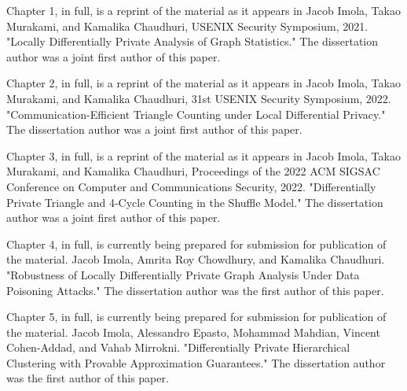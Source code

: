 \documentclass[12pt]{ucsddissertation}
\begin{document}
\begin{acknowledgements}
Chapter 1, in full, is a reprint of the material as it appears in Jacob Imola,
Takao Murakami, and Kamalika Chaudhuri, USENIX Security Symposium, 2021.
"Locally Differentially Private Analysis of Graph Statistics." 
The dissertation author was a joint first author of this paper.

Chapter 2, in full, is a reprint of the material as it appears in
Jacob Imola,
Takao Murakami, and Kamalika Chaudhuri, 31st USENIX Security Symposium, 2022.
"Communication-Efficient Triangle Counting under Local Differential Privacy." 
The dissertation author was a joint first author of this paper.

Chapter 3, in full, is a reprint of the material as it appears in Jacob Imola,
Takao Murakami, and Kamalika Chaudhuri, Proceedings of the 2022 ACM SIGSAC Conference on 
Computer and Communications Security, 2022. "Differentially Private Triangle and 4-Cycle 
Counting in the Shuffle Model." The dissertation author was a joint first author of this paper.

Chapter 4, in full, is currently being prepared for submission for publication of the material.
Jacob Imola, Amrita Roy Chowdhury, and Kamalika Chaudhuri.
"Robustness of Locally Differentially Private Graph Analysis Under Data Poisoning Attacks."
The dissertation author was the first author of this paper.

Chapter 5, in full, is currently being prepared for submission for publication of the material.
Jacob Imola, Alessandro Epasto, Mohammad Mahdian, Vincent Cohen-Addad, and Vahab Mirrokni.
"Differentially Private Hierarchical Clustering with Provable Approximation Guarantees."
The dissertation author was the first author of this paper.

\end{acknowledgements}
\end{document}
